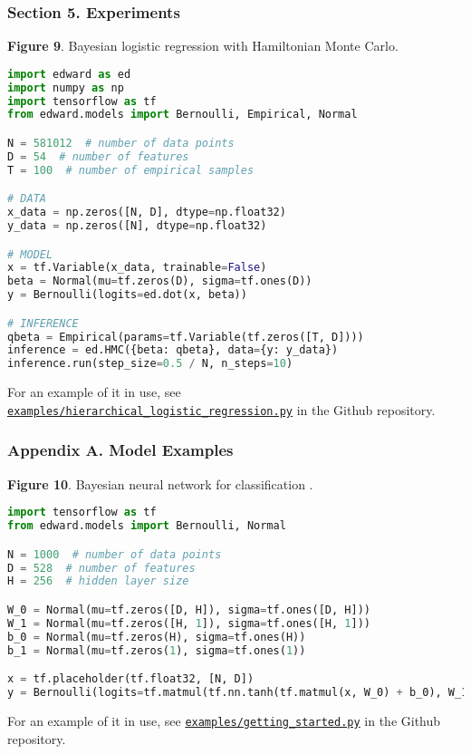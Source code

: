 \subsubsection{Section 5. Experiments}

\textbf{Figure 9}. Bayesian logistic regression with Hamiltonian Monte Carlo.
\begin{lstlisting}[language=python]
import edward as ed
import numpy as np
import tensorflow as tf
from edward.models import Bernoulli, Empirical, Normal

N = 581012  # number of data points
D = 54  # number of features
T = 100  # number of empirical samples

# DATA
x_data = np.zeros([N, D], dtype=np.float32)
y_data = np.zeros([N], dtype=np.float32)

# MODEL
x = tf.Variable(x_data, trainable=False)
beta = Normal(mu=tf.zeros(D), sigma=tf.ones(D))
y = Bernoulli(logits=ed.dot(x, beta))

# INFERENCE
qbeta = Empirical(params=tf.Variable(tf.zeros([T, D])))
inference = ed.HMC({beta: qbeta}, data={y: y_data})
inference.run(step_size=0.5 / N, n_steps=10)
\end{lstlisting}
For an example of it in use, see
\href{https://github.com/blei-lab/edward/blob/master/examples/hierarchical_logistic_regression.py}{\texttt{examples/hierarchical_logistic_regression.py}}
in the Github repository.

\subsubsection{Appendix A. Model Examples}

\textbf{Figure 10}. Bayesian neural network for classification \citep{denker1987large}.
\begin{lstlisting}[language=python]
import tensorflow as tf
from edward.models import Bernoulli, Normal

N = 1000  # number of data points
D = 528  # number of features
H = 256  # hidden layer size

W_0 = Normal(mu=tf.zeros([D, H]), sigma=tf.ones([D, H]))
W_1 = Normal(mu=tf.zeros([H, 1]), sigma=tf.ones([H, 1]))
b_0 = Normal(mu=tf.zeros(H), sigma=tf.ones(H))
b_1 = Normal(mu=tf.zeros(1), sigma=tf.ones(1))

x = tf.placeholder(tf.float32, [N, D])
y = Bernoulli(logits=tf.matmul(tf.nn.tanh(tf.matmul(x, W_0) + b_0), W_1) + b_1)
\end{lstlisting}
For an example of it in use, see
\href{https://github.com/blei-lab/edward/blob/master/examples/getting_started.py}{\texttt{examples/getting_started.py}}
in the Github repository.

